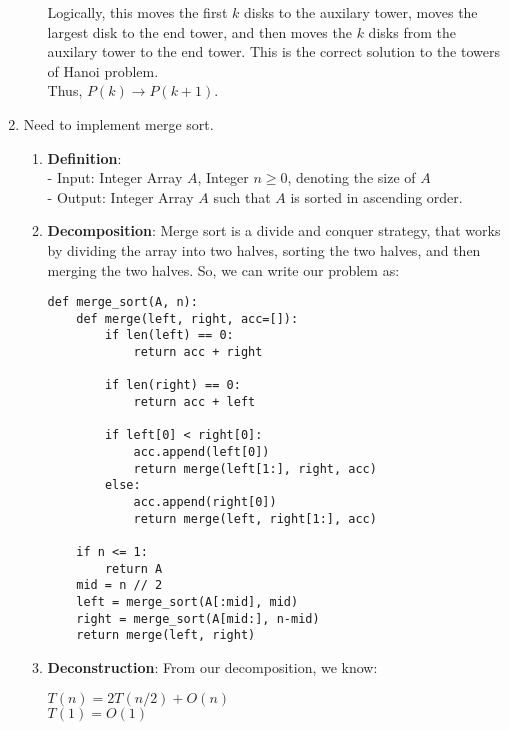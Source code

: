 \documentclass[a4paper]{article}
\begin{document}
\begin{enumerate}
\begin{enumerate}[label=\roman*]
Logically, this moves the first $k$ disks to the auxilary tower, moves the largest disk to the end tower, and then moves the $k$ disks from the auxilary tower to the end tower. This is the correct solution to the towers of Hanoi problem.\\

Thus, $P(k) \rightarrow P(k+1)$.\\

\end{enumerate}

\item Need to implement merge sort.

\begin{enumerate}[label=\roman*]
    \item \textbf{Definition}:\\
    - Input: Integer Array $A$, Integer $n \geq 0$, denoting the size of $A$\\
    - Output: Integer Array $A$ such that $A$ is sorted in ascending order.

    \item \textbf{Decomposition}: Merge sort is a divide and conquer strategy, that works by dividing the array into two halves, sorting the two halves, and then merging the two halves. So, we can write our problem as:
    
\vspace{1in}
\begin{verbatim}
def merge_sort(A, n):
    def merge(left, right, acc=[]):
        if len(left) == 0:
            return acc + right

        if len(right) == 0:
            return acc + left

        if left[0] < right[0]:
            acc.append(left[0])
            return merge(left[1:], right, acc)
        else:
            acc.append(right[0])
            return merge(left, right[1:], acc)

    if n <= 1:
        return A
    mid = n // 2
    left = merge_sort(A[:mid], mid)
    right = merge_sort(A[mid:], n-mid)
    return merge(left, right)
\end{verbatim}

\item \textbf{Deconstruction}: From our decomposition, we know:
\begin{center}
    $T(n) = 2T(n/2) + O(n)$\\
    $T(1) = O(1)$
\end{center}



\end{enumerate}
\end{enumerate}
\end{document}
